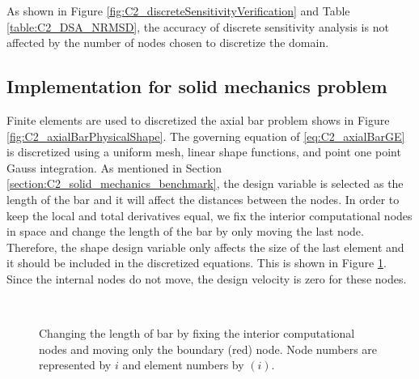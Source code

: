As shown in Figure \ref{fig:C2_discreteSensitivityVerification} and Table \ref{table:C2_DSA_NRMSD}, the accuracy of discrete sensitivity analysis is not affected by the number of nodes chosen to discretize the domain.

\subsection{Implementation for solid mechanics problem}
Finite elements are used to discretized the axial bar problem shows in Figure \ref{fig:C2_axialBarPhysicalShape}. The governing equation of \eqref{eq:C2_axialBarGE} is discretized using a uniform mesh, linear shape functions, and point one point Gauss integration. As mentioned in Section \ref{section:C2_solid_mechanics_benchmark}, the design variable is selected as the length of the bar and it will affect the distances between the nodes. In order to keep the local and total derivatives equal, we fix the interior computational nodes in space and change the length of the bar by only moving the last node. Therefore, the shape design variable only affects the size of the last element and it should be included in the discretized equations. This is shown in Figure \ref{fig:C2_axialBarComputationalDomain}. Since the internal nodes do not move, the design velocity is zero for these nodes.

\begin{figure}[H]
	\centering
	\\
	\caption{Changing the length of bar by fixing the interior computational nodes and moving only the boundary (red) node. Node numbers are represented by $i$ and element numbers by $(i)$.}
	\label{fig:C2_axialBarComputationalDomain}
\end{figure}

